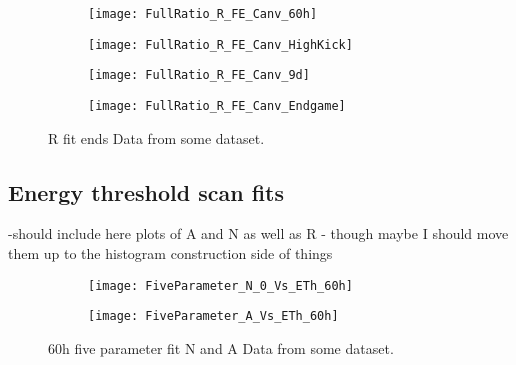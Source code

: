 \begin{figure}[]
\centering
    \begin{subfigure}[]{0.45\textwidth}
        \centering
        \texttt{[image: FullRatio\_R\_FE\_Canv\_60h]}
        \caption{}
    \end{subfigure}%
    \begin{subfigure}[]{0.45\textwidth}
        \centering
        \texttt{[image: FullRatio\_R\_FE\_Canv\_HighKick]}
        \caption{}
    \end{subfigure}

    \begin{subfigure}[]{0.45\textwidth}
        \centering
        \texttt{[image: FullRatio\_R\_FE\_Canv\_9d]}
        \caption{}
    \end{subfigure}%
    \begin{subfigure}[]{0.45\textwidth}
        \centering
        \texttt{[image: FullRatio\_R\_FE\_Canv\_Endgame]}
        \caption{}
    \end{subfigure}
\caption[]{R fit ends Data from some dataset.}
\label{fig:}
\end{figure}


\subsection{Energy threshold scan fits}

-should include here plots of A and N as well as R - though maybe I should move them up to the histogram construction side of things

\begin{figure}[]
\centering
    \begin{subfigure}[]{0.45\textwidth}
        \centering
        \texttt{[image: FiveParameter\_N\_0\_Vs\_ETh\_60h]}
        \caption{}
    \end{subfigure}%
    \begin{subfigure}[]{0.45\textwidth}
        \centering
        \texttt{[image: FiveParameter\_A\_Vs\_ETh\_60h]}
        \caption{}
    \end{subfigure}
\caption[]{60h five parameter fit N and A Data from some dataset.}
\label{fig:}
\end{figure}



